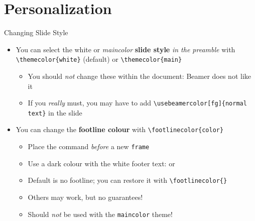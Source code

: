 \section{Personalization}

\begin{frame}[fragile]{Changing Slide Style}
\begin{itemize}
\item You can select the white or \textit{maincolor} \textbf{slide style} \emph{in the 
preamble} with \verb|\themecolor{white}| (default) or \verb|\themecolor{main}|
      \begin{itemize}
      \item You should \emph{not} change these within the document: Beamer does 
      not like it
      \item If you \emph{really} must, you may have to add 
      \verb|\usebeamercolor[fg]{normal text}| in the slide
      \end{itemize}
\item You can change the \textbf{footline colour} with 
\verb|\footlinecolor{color}|
      \begin{itemize}
      \item Place the command \emph{before} a new \verb|frame|
      \item Use a dark colour with the white footer text:
       or 
      \item Default is no footline; you can restore it with 
      \verb|\footlinecolor{}|
      \item Others may work, but no guarantees!
      \item Should \emph{not} be used with the \verb|maincolor| theme!
      \end{itemize}
\end{itemize}
\end{frame}

